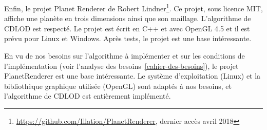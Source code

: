 Enfin, le projet Planet Renderer de Robert
Lindner\footnote{\url{https://github.com/Illation/PlanetRenderer},
dernier accès avril 2018}. Ce projet, sous licence MIT, affiche une
planète en trois dimensions ainsi que son maillage. L'algorithme de
CDLOD est respecté. Le projet est écrit en C++ et avec OpenGL 4.5 et il
est prévu pour Linux et Windows. Après tests, le projet est une base
intéressante.

En vu de nos besoins sur l'algorithme à implémenter et sur les
conditions de l'implémentation (voir l'analyse des
besoins~\ref{cahier-des-besoins}), le projet PlanetRenderer est une base
intéressante. Le système d'exploitation (Linux) et la bibliothèque
graphique utilisée (OpenGL) sont adaptés à nos besoins, et l'algorithme
de CDLOD est entièrement implémenté.
